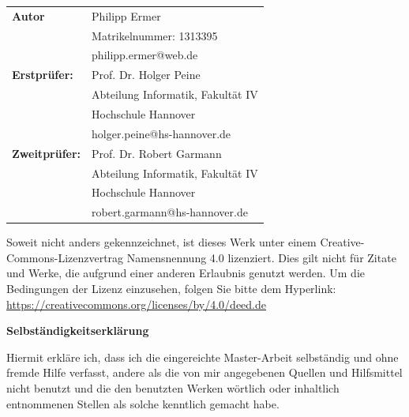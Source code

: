 \documentclass[fontsize=12pt,paper=a4,twoside=semi,parskip=half-,headsepline,headinclude]{scrreprt}
\begin{document}
\vspace*{-3cm}


\newpage 
\thispagestyle{empty}
\quad 


  \newpage \thispagestyle{empty}
 \begin{tabular}{ll}
{\bfseries\sffamily Autor} &  Philipp Ermer \\ 
            & Matrikelnummer: 1313395 \\
            & philipp.ermer@web.de \\[5ex]
{\bfseries\sffamily Erstprüfer:} & Prof. Dr. Holger Peine \\
          & Abteilung Informatik, Fakultät IV \\
         & Hochschule Hannover \\
        & holger.peine@hs-hannover.de \\[5ex]
{\bfseries\sffamily Zweitprüfer:} &Prof. Dr. Robert Garmann \\
          & Abteilung Informatik, Fakultät IV \\
         & Hochschule Hannover \\
        & robert.garmann@hs-hannover.de
\end{tabular}

\vfill

Soweit nicht anders gekennzeichnet, ist dieses Werk unter einem
Creative-Commons-Lizenzvertrag Namensnennung 4.0 lizenziert.
Dies gilt nicht für Zitate und Werke, die aufgrund einer anderen Erlaubnis
genutzt werden.
Um die Bedingungen der Lizenz einzusehen, folgen Sie bitte dem Hyperlink:\\
\url{https://creativecommons.org/licenses/by/4.0/deed.de}

\vfill

\begin{center} \sffamily\bfseries Selbständigkeitserklärung \end{center}

Hiermit erkläre ich, dass ich die eingereichte Master-Arbeit
selbständig und ohne fremde Hilfe verfasst, andere als die von mir angegebenen Quellen
und Hilfsmittel nicht benutzt und die den benutzten Werken wörtlich oder
inhaltlich entnommenen Stellen als solche kenntlich gemacht habe. 
\vspace*{7ex}
\end{document}
